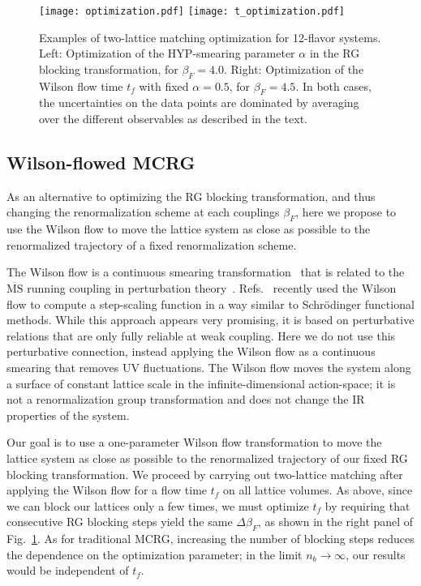 \documentclass{PoS}
\newcommand{\al}{\ensuremath{\alpha} }
\newcommand{\be}{\ensuremath{\beta} }
\newcommand{\De}{\ensuremath{\Delta} }
\newcommand{\MSbar}{\ensuremath{\overline{\textrm{MS}}} }
\newcommand{\fig}[1]{Fig.~\ref{#1}}
\begin{document}
\begin{figure}[htpb]
  \centering
  \texttt{[image: optimization.pdf]}\hfill
  \texttt{[image: t\_optimization.pdf]}
  \caption{Examples of two-lattice matching optimization for 12-flavor systems.  Left: Optimization of the HYP-smearing parameter \al in the RG blocking transformation, for $\be_F = 4.0$.  Right: Optimization of the Wilson flow time $t_f$ with fixed $\al = 0.5$, for $\be_F = 4.5$.  In both cases, the uncertainties on the data points are dominated by averaging over the different observables as described in the text.}
  \label{fig:opt}
\end{figure}



\subsection{\label{sec:WMCRG}Wilson-flowed MCRG} %
As an alternative to optimizing the RG blocking transformation, and thus changing the renormalization scheme at each couplings $\be_F$, here we propose to use the Wilson flow to move the lattice system as close as possible to the renormalized trajectory of a fixed renormalization scheme.

The Wilson flow is a continuous smearing transformation~\cite{Narayanan:2006rf} that is related to the \MSbar running coupling in perturbation theory~\cite{Luscher:2010iy}.
Refs.~\cite{Fodor:2012td, Fodor:2012qh} recently used the Wilson flow to compute a step-scaling function in a way similar to Schr\"odinger functional methods.
While this approach appears very promising, it is based on perturbative relations that are only fully reliable at weak coupling.
Here we do not use this perturbative connection, instead applying the Wilson flow as a continuous smearing that removes UV fluctuations.
The Wilson flow moves the system along a surface of constant lattice scale in the infinite-dimensional action-space; it is not a renormalization group transformation and does not change the IR properties of the system.

Our goal is to use a one-parameter Wilson flow transformation to move the lattice system as close as possible to the renormalized trajectory of our fixed RG blocking transformation.
We proceed by carrying out two-lattice matching after applying the Wilson flow for a flow time $t_f$ on all lattice volumes.
As above, since we can block our lattices only a few times, we must optimize $t_f$ by requiring that consecutive RG blocking steps yield the same $\De\be_F$, as shown in the right panel of \fig{fig:opt}.
As for traditional MCRG, increasing the number of blocking steps reduces the dependence on the optimization parameter; in the limit $n_b \to \infty$, our results would be independent of $t_f$.
\end{document}
